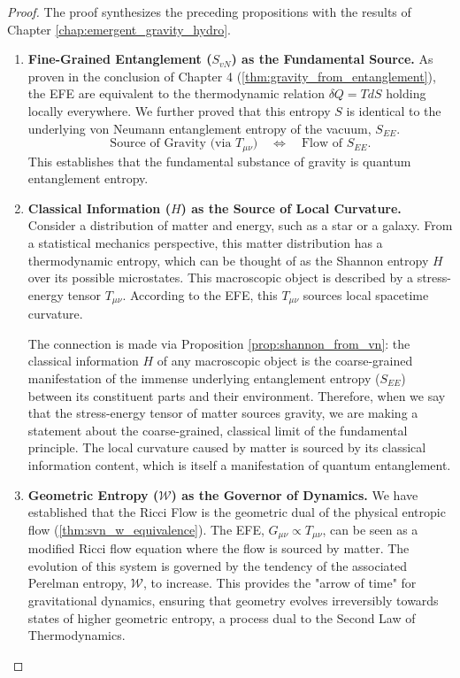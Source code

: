 \documentclass[11pt, letterpaper]{report}
\theoremstyle{plain} %
\theoremstyle{definition} %
\theoremstyle{remark} %
\begin{document}
\begin{proof}
The proof synthesizes the preceding propositions with the results of Chapter \ref{chap:emergent_gravity_hydro}.
\begin{enumerate}
    \item \textbf{Fine-Grained Entanglement ($S_{vN}$) as the Fundamental Source.} As proven in the conclusion of Chapter 4 (\cref{thm:gravity_from_entanglement}), the EFE are equivalent to the thermodynamic relation $\delta Q = T dS$ holding locally everywhere. We further proved that this entropy $S$ is identical to the underlying von Neumann entanglement entropy of the vacuum, $S_{EE}$.
    \begin{equation}
        \text{Source of Gravity (via } T_{\mu\nu}) \quad \Longleftrightarrow \quad \text{Flow of } S_{EE}.
    \end{equation}
    This establishes that the fundamental substance of gravity is quantum entanglement entropy.

    \item \textbf{Classical Information ($H$) as the Source of Local Curvature.} Consider a distribution of matter and energy, such as a star or a galaxy. From a statistical mechanics perspective, this matter distribution has a thermodynamic entropy, which can be thought of as the Shannon entropy $H$ over its possible microstates. This macroscopic object is described by a stress-energy tensor $T_{\mu\nu}$. According to the EFE, this $T_{\mu\nu}$ sources local spacetime curvature.
    
    The connection is made via Proposition \ref{prop:shannon_from_vn}: the classical information $H$ of any macroscopic object is the coarse-grained manifestation of the immense underlying entanglement entropy ($S_{EE}$) between its constituent parts and their environment. Therefore, when we say that the stress-energy tensor of matter sources gravity, we are making a statement about the coarse-grained, classical limit of the fundamental principle. The local curvature caused by matter is sourced by its classical information content, which is itself a manifestation of quantum entanglement.

    \item \textbf{Geometric Entropy ($\mathcal{W}$) as the Governor of Dynamics.} We have established that the Ricci Flow is the geometric dual of the physical entropic flow (\cref{thm:svn_w_equivalence}). The EFE, $G_{\mu\nu} \propto T_{\mu\nu}$, can be seen as a modified Ricci flow equation where the flow is sourced by matter. The evolution of this system is governed by the tendency of the associated Perelman entropy, $\mathcal{W}$, to increase. This provides the "arrow of time" for gravitational dynamics, ensuring that geometry evolves irreversibly towards states of higher geometric entropy, a process dual to the Second Law of Thermodynamics.
\end{enumerate}
\end{proof}
\end{document}
